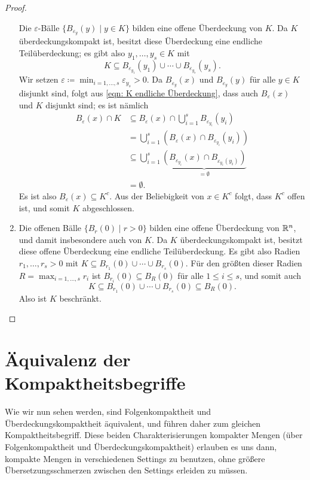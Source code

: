 \documentclass[a4paper,10pt]{article}
\begin{document}
\begin{proof}
\begin{enumerate}
   Die $\varepsilon$-Bälle $\{B_{\varepsilon_y}(y) \mid y \in K\}$ bilden eine offene Überdeckung von $K$. Da $K$ überdeckungskompakt ist, besitzt diese Überdeckung eine endliche Teilüberdeckung; es gibt also $y_1, \dotsc, y_s \in K$ mit
   \begin{equation}\label{eqn: K endliche Überdeckung}
    K \subseteq B_{\varepsilon_{y_1}}(y_1) \cup \dotsb \cup B_{\varepsilon_{y_s}}(y_s).
   \end{equation}
   Wir setzen $\varepsilon \coloneqq \min_{i=1,\dotsc,s} \varepsilon_{y_s} > 0$. Da $B_{\varepsilon_y}(x)$ und $B_{\varepsilon_y}(y)$ für alle $y \in K$ disjunkt sind, folgt aus \eqref{eqn: K endliche Überdeckung}, dass auch $B_\varepsilon(x)$ und $K$ disjunkt sind; es ist nämlich
   \begin{align*}
    B_\varepsilon(x) \cap K
    &\subseteq B_\varepsilon(x) \cap \bigcup_{i=1}^s B_{\varepsilon_{y_i}}(y_i) \\
    &= \bigcup_{i=1}^s (B_\varepsilon(x) \cap B_{\varepsilon_{y_i}}(y_i)) \\
    &\subseteq \bigcup_{i=1}^s \underbrace{(B_{\varepsilon_{y_i}}(x) \cap B_{\varepsilon_{y_i}(y_i)})}_{= \emptyset} \\
    &= \emptyset.
   \end{align*}
   Es ist also $B_\varepsilon(x) \subseteq K^c$. Aus der Beliebigkeit von $x \in K^c$ folgt, dass $K^c$ offen ist, und somit $K$ abgeschlossen.
  \item
   Die offenen Bälle $\{B_r(0) \mid r > 0\}$ bilden eine offene Überdeckung von $\mathbb{R}^n$, und damit insbesondere auch von $K$. Da $K$ überdeckungskompakt ist, besitzt diese offene Überdeckung eine endliche Teilüberdeckung. Es gibt also Radien $r_1, \dotsc, r_s > 0$ mit $K \subseteq B_{r_1}(0) \cup \dotsb \cup B_{r_s}(0)$. Für den größten dieser Radien $R = \max_{i=1,\dotsc,s} r_i$ ist $B_{r_i}(0) \subseteq B_R(0)$ für alle $1 \leq i \leq s$, und somit auch
   \[
    K \subseteq B_{r_1}(0) \cup \dotsb \cup B_{r_s}(0) \subseteq B_R(0).
   \]
   Also ist $K$ beschränkt.
  \qedhere
 \end{enumerate}
\end{proof}





\section{Äquivalenz der Kompaktheitsbegriffe}
Wie wir nun sehen werden, sind Folgenkompaktheit und Überdeckungskompaktheit äquivalent, und führen daher zum gleichen Kompaktheitsbegriff. Diese beiden Charakterisierungen kompakter Mengen (über Folgenkompaktheit und Überdeckungskompaktheit) erlauben es uns dann, kompakte Mengen in verschiedenen Settings zu benutzen, ohne größere Übersetzungsschmerzen zwischen den Settings erleiden zu müssen.
\end{document}
